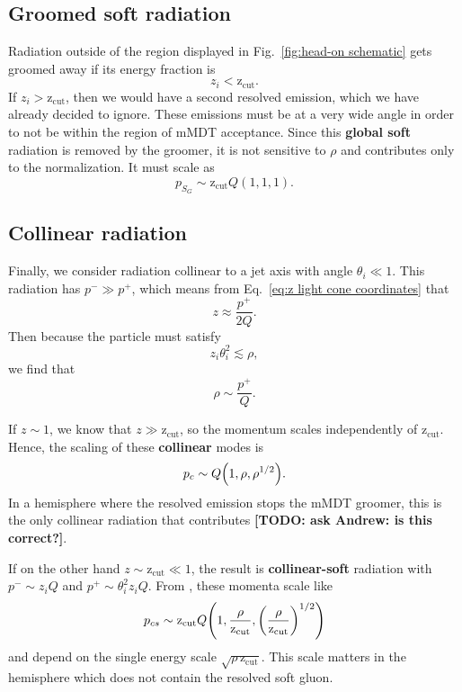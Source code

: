 \documentclass[12pt,twoside,class=../reedthesis, crop=false]{standalone}
\providecommand{\zcut}{\mathrm{z_{cut}}}
\begin{document}
\subsection{Groomed soft radiation}
	Radiation outside of the region displayed in Fig.~\ref{fig:head-on schematic} gets groomed away if its energy fraction is
	\begin{equation}
		z_i < \zcut.
	\end{equation}
	If $z_i > \zcut$, then we would have a second resolved emission, which we have already decided to ignore. These emissions must be at a very wide angle in order to not be within the region of mMDT acceptance. Since this \textbf{global soft} radiation is removed by the groomer, it is not sensitive to $\rho$ and contributes only to the normalization. It must scale as
	\begin{equation}
		p_{S_G} \sim \zcut Q(1, 1, 1).
	\end{equation}

\subsection{Collinear radiation}\label{sec:collinear radiation}
	Finally, we consider radiation collinear to a jet axis with angle $\theta_i \ll 1$. This radiation has $p^- \gg p^+$, which means from Eq.~\ref{eq:z light cone coordinates} that
	\begin{equation}
		z \approx \frac{p^+}{2Q}.
	\end{equation}
	Then because the particle must satisfy
	\begin{equation}
		z_i \theta_i^2 \lesssim \rho,
	\end{equation}
	we find that \cite{frye_factorization_2016}
	\begin{equation}
		\rho \sim \frac{p^+}{Q}.
	\end{equation}

	If $z \sim 1$, we know that $z \gg \zcut$, so the momentum scales independently of $\zcut$. Hence, the scaling of these \textbf{collinear} modes is \cite{frye_factorization_2016}
	\begin{equation}
		p_c \sim Q \qty(1, \rho, \rho^{1/2}).
	\end{equation}
	In a hemisphere where the resolved emission stops the mMDT groomer, this is the only collinear radiation that contributes {\color{red}\textbf{[TODO: ask Andrew: is this correct?]}}.

	If on the other hand $z \sim \zcut \ll 1$, the result is \textbf{collinear-soft} radiation with $p^- \sim z_i Q$ and $p^+ \sim \theta_i^2 z_i Q$. From \cite{frye_factorization_2016}, these momenta scale like
	\begin{equation}
		p_{cs} \sim \zcut Q \qty(1, \frac{\rho}{\zcut}, \qty(\frac{\rho}{\zcut})^{1/2})
	\end{equation}
	and depend on the single energy scale $\sqrt{\rho\,\zcut}$. This scale matters in the hemisphere which does not contain the resolved soft gluon.
\end{document}
